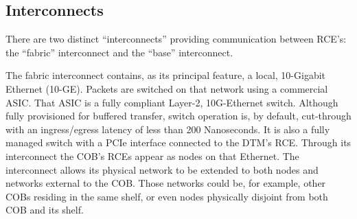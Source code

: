 \subsection{Interconnects}
\label{sec:Interconnects}
There are two distinct ``interconnects''  providing communication between RCE's: the
``fabric'' interconnect and the ``base'' interconnect.


The fabric interconnect contains, as its principal feature, 
a local, 10-Gigabit Ethernet (10-GE).
Packets are switched on that network using a commercial  ASIC. 
That ASIC is a fully compliant Layer-2, 10G-Ethernet switch. 
Although fully provisioned for buffered transfer, switch operation is, 
by default, cut-through with an ingress/egress latency of less than 200 Nanoseconds.
It is also a fully managed switch with a PCIe interface connected to the DTM's RCE. 
Through its interconnect the COB's RCEs appear as nodes on that Ethernet. 
The interconnect allows its physical network to be extended to both nodes 
and networks external to the COB. 
Those networks could be, for example, other COBs residing in the same shelf, 
or even nodes physically disjoint from both COB and its shelf.
%

